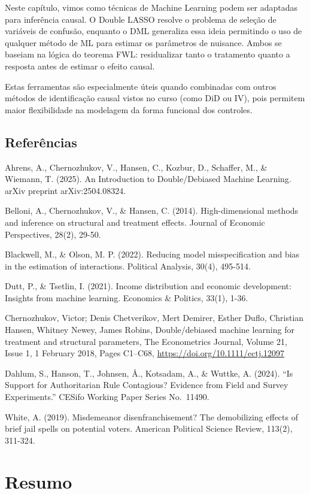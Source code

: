 \documentclass[
]{article}
\begin{document}
Neste capítulo, vimos como técnicas de Machine Learning podem ser adaptadas para inferência causal. O Double LASSO resolve o problema de seleção de variáveis de confusão, enquanto o DML generaliza essa ideia permitindo o uso de qualquer método de ML para estimar os parâmetros de nuisance. Ambos se baseiam na lógica do teorema FWL: residualizar tanto o tratamento quanto a resposta antes de estimar o efeito causal.

Estas ferramentas são especialmente úteis quando combinadas com outros métodos de identificação causal vistos no curso (como DiD ou IV), pois permitem maior flexibilidade na modelagem da forma funcional dos controles.

\subsection{Referências}\label{referuxeancias-4}

Ahrens, A., Chernozhukov, V., Hansen, C., Kozbur, D., Schaffer, M., \& Wiemann, T. (2025). An Introduction to Double/Debiased Machine Learning. arXiv preprint arXiv:2504.08324.

Belloni, A., Chernozhukov, V., \& Hansen, C. (2014). High-dimensional methods and inference on structural and treatment effects. Journal of Economic Perspectives, 28(2), 29-50.

Blackwell, M., \& Olson, M. P. (2022). Reducing model misspecification and bias in the estimation of interactions. Political Analysis, 30(4), 495-514.

Dutt, P., \& Tsetlin, I. (2021). Income distribution and economic development: Insights from machine learning. Economics \& Politics, 33(1), 1-36.

Chernozhukov, Victor; Denis Chetverikov, Mert Demirer, Esther Duflo, Christian Hansen, Whitney Newey, James Robins, Double/debiased machine learning for treatment and structural parameters, The Econometrics Journal, Volume 21, Issue 1, 1 February 2018, Pages C1--C68, \url{https://doi.org/10.1111/ectj.12097}

Dahlum, S., Hanson, T., Johnsen, Å., Kotsadam, A., \& Wuttke, A. (2024). ``Is Support for Authoritarian Rule Contagious? Evidence from Field and Survey Experiments.'' CESifo Working Paper Series No.~11490.

White, A. (2019). Misdemeanor disenfranchisement? The demobilizing effects of brief jail spells on potential voters. American Political Science Review, 113(2), 311-324.

\section{Resumo}\label{resumo-3}
\end{document}
